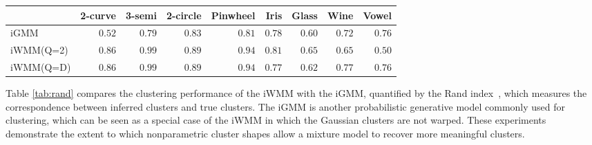\begin{table*}[ht!]
\centering
\caption[Clustering performance comparison]
{Average Rand index for evaluating clustering performance.}
\label{tab:rand}
\begin{tabular}{lrrrrrrrr}
\hline
 & 2-curve & 3-semi & 2-circle & Pinwheel & Iris  & Glass  & Wine  & Vowel  \\
\hline
iGMM & $0.52$ & $0.79$ & $0.83$ & $0.81$ & $0.78$ & $0.60$ & $0.72$ & $\mathbf{0.76}$ \\
iWMM(Q=2) & $\mathbf{0.86}$ & $\mathbf{0.99}$ & $\mathbf{0.89}$ & $\mathbf{0.94}$ & $\mathbf{0.81}$ & $\mathbf{0.65}$ & $0.65$ & $0.50$ \\
iWMM(Q=D) & $\mathbf{0.86}$ & $\mathbf{0.99}$ & $\mathbf{0.89}$ & $\mathbf{0.94}$ & $0.77$ & $0.62$ & $\mathbf{0.77}$ & $\mathbf{0.76}$ \\
\hline
\end{tabular}
\end{table*}
%
Table \ref{tab:rand} compares the clustering performance of the iWMM with the iGMM, quantified by the Rand index~\cite{rand1971objective}, which measures the correspondence between inferred clusters and true clusters.
The iGMM is another probabilistic generative model commonly used for clustering, which can be seen as a special case of the iWMM in which the Gaussian clusters are not warped.  
These experiments demonstrate the extent to which nonparametric cluster shapes allow a mixture model to recover more meaningful clusters.



